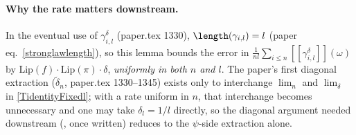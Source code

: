 \begin{lemma}
  \paragraph{Why the rate matters downstream.} In the eventual use of $\gamma^\delta_{i,l}$ (paper.tex
  1330), $\length(\gamma_{i,l}) = l$ (paper eq.~\eqref{stronglawlength}), so this lemma bounds the
  error in $\frac{1}{n l}\sum_{i \le n} [[\gamma^{\delta}_{i,l}]](\omega)$ by
  $\mathrm{Lip}(f)\cdot\mathrm{Lip}(\pi)\cdot\delta$, \emph{uniformly in both $n$ and $l$}. The paper's
  first diagonal extraction ($\tilde\delta_n$, paper.tex 1330--1345) exists only to interchange
  $\lim_n$ and $\lim_\delta$ in \eqref{TidentityFixedl}; with a rate uniform in $n$, that interchange
  becomes unnecessary and one may take $\delta_l = 1/l$ directly, so the diagonal argument needed
  downstream (, once written) reduces to the $\psi$-side extraction alone.
\end{lemma}
